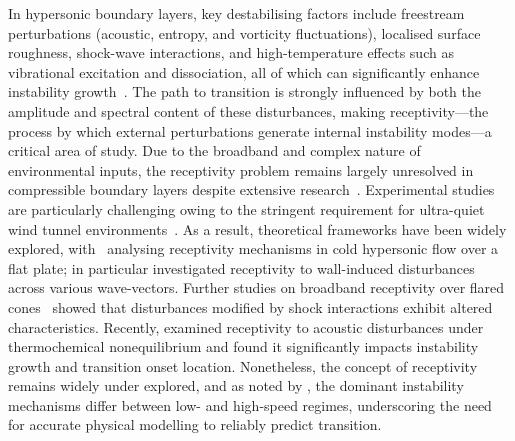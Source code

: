 In hypersonic boundary layers, key destabilising factors include freestream perturbations (acoustic, entropy, and vorticity fluctuations), localised surface roughness, shock-wave interactions, and high-temperature effects such as vibrational excitation and dissociation, all of which can significantly enhance instability growth~\citep{vandereynde2015,Bitter2015}. The path to transition is strongly influenced by both the amplitude and spectral content of these disturbances, making receptivity—the process by which external perturbations generate internal instability modes—a critical area of study. Due to the broadband and complex nature of environmental inputs, the receptivity problem remains largely unresolved in compressible boundary layers despite extensive research~\citep{Cerminara2019}. Experimental studies are particularly challenging owing to the stringent requirement for ultra-quiet wind tunnel environments~\citep{Fedorov2011}. As a result, theoretical frameworks have been widely explored, with~\citet{Fedorov2001,Fedorov2002,MaZhong2003a,MaZhong2003b} analysing receptivity mechanisms in cold hypersonic flow over a flat plate; \citet{Fedorov2002} in particular investigated receptivity to wall-induced disturbances across various wave-vectors. Further studies on broadband receptivity over flared cones~\citep{Balakumar2018,HeZhong2022} showed that disturbances modified by shock interactions exhibit altered characteristics. Recently, \citet{Varma2025} examined receptivity to acoustic disturbances under thermochemical nonequilibrium and found it significantly impacts instability growth and transition onset location. Nonetheless, the concept of receptivity remains widely under explored, and as noted by \citet{Zhong2012}, the dominant instability mechanisms differ between low- and high-speed regimes, underscoring the need for accurate physical modelling to reliably predict transition.






